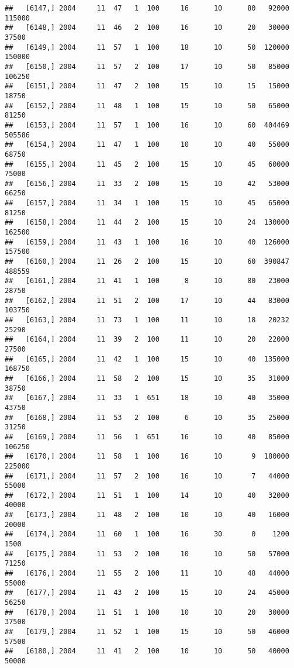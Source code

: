 \documentclass{article}\usepackage[]{graphicx}\usepackage[]{color}
\makeatletter
\newenvironment{kframe}{%
 \def\at@end@of@kframe{}%
 \ifinner\ifhmode%
  \def\at@end@of@kframe{\end{minipage}}%
  \begin{minipage}{\columnwidth}%
 \fi\fi%
 \def\FrameCommand##1{\hskip\@totalleftmargin \hskip-\fboxsep
 \colorbox{shadecolor}{##1}\hskip-\fboxsep
     \hskip-\linewidth \hskip-\@totalleftmargin \hskip\columnwidth}%
 \MakeFramed {\advance\hsize-\width
   \@totalleftmargin\z@ \linewidth\hsize
   \@setminipage}}%
 {\par\unskip\endMakeFramed%
 \at@end@of@kframe}
\newenvironment{knitrout}{}{} %
\makeatother
\begin{document}
\begin{knitrout}
\begin{kframe}
\begin{verbatim}
##   [6147,] 2004     11  47   1  100     16      10      80   92000  115000
##   [6148,] 2004     11  46   2  100     16      10      20   30000   37500
##   [6149,] 2004     11  57   1  100     18      10      50  120000  150000
##   [6150,] 2004     11  57   2  100     17      10      50   85000  106250
##   [6151,] 2004     11  47   2  100     15      10      15   15000   18750
##   [6152,] 2004     11  48   1  100     15      10      50   65000   81250
##   [6153,] 2004     11  57   1  100     16      10      60  404469  505586
##   [6154,] 2004     11  47   1  100     10      10      40   55000   68750
##   [6155,] 2004     11  45   2  100     15      10      45   60000   75000
##   [6156,] 2004     11  33   2  100     15      10      42   53000   66250
##   [6157,] 2004     11  34   1  100     15      10      45   65000   81250
##   [6158,] 2004     11  44   2  100     15      10      24  130000  162500
##   [6159,] 2004     11  43   1  100     16      10      40  126000  157500
##   [6160,] 2004     11  26   2  100     15      10      60  390847  488559
##   [6161,] 2004     11  41   1  100      8      10      80   23000   28750
##   [6162,] 2004     11  51   2  100     17      10      44   83000  103750
##   [6163,] 2004     11  73   1  100     11      10      18   20232   25290
##   [6164,] 2004     11  39   2  100     11      10      20   22000   27500
##   [6165,] 2004     11  42   1  100     15      10      40  135000  168750
##   [6166,] 2004     11  58   2  100     15      10      35   31000   38750
##   [6167,] 2004     11  33   1  651     18      10      40   35000   43750
##   [6168,] 2004     11  53   2  100      6      10      35   25000   31250
##   [6169,] 2004     11  56   1  651     16      10      40   85000  106250
##   [6170,] 2004     11  58   1  100     16      10       9  180000  225000
##   [6171,] 2004     11  57   2  100     16      10       7   44000   55000
##   [6172,] 2004     11  51   1  100     14      10      40   32000   40000
##   [6173,] 2004     11  48   2  100     10      10      40   16000   20000
##   [6174,] 2004     11  60   1  100     16      30       0    1200    1500
##   [6175,] 2004     11  53   2  100     10      10      50   57000   71250
##   [6176,] 2004     11  55   2  100     11      10      48   44000   55000
##   [6177,] 2004     11  43   2  100     15      10      24   45000   56250
##   [6178,] 2004     11  51   1  100     10      10      20   30000   37500
##   [6179,] 2004     11  52   1  100     15      10      50   46000   57500
##   [6180,] 2004     11  41   2  100     10      10      50   40000   50000

\end{verbatim}
\end{kframe}
\end{knitrout}
\end{document}

